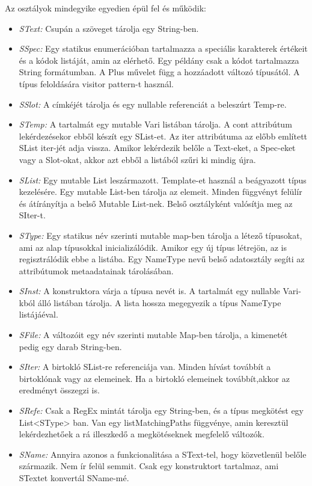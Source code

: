{Az osztályok mindegyike egyedien épül fel és működik:
\begin{itemize}
\item \emph{SText:} 
Csupán a szöveget tárolja egy String-ben.
\item \emph{SSpec:} 
Egy statikus enumerációban tartalmazza a speciális karakterek értékeit és a kódok listáját, amin az elérhető.
Egy példány csak a kódot tartalmazza String formátumban.
A Plus művelet függ a hozzáadott változó típusától.
A típus feloldására visitor pattern-t használ. 
\item \emph{SSlot:} 
A címkéjét tárolja és egy nullable referenciát a beleszúrt Temp-re. 
\item \emph{STemp:} 
A tartalmát egy mutable Vari listában tárolja.
A cont attribútum lekérdezésekor ebből készít egy SList-et.
Az iter attribútuma az előbb említett SList iter-jét adja vissza. 
Amikor lekérdezik belőle a Text-eket, a Spec-eket vagy a Slot-okat, akkor azt ebből a listából szűri ki mindig újra.
\item \emph{SList:}
Egy mutable List leszármazott.
Template-et használ a beágyazott típus kezelésére.
Egy mutable List-ben tárolja az elemeit.
Minden függvényt felülír és átírányítja a belső Mutable List-nek.
Belső osztályként valósítja meg az SIter-t. 
\item \emph{SType:} 
Egy statikus név szerinti mutable map-ben tárolja a létező típusokat, ami az alap típusokkal inicializálódik.
Amikor egy új típus létrejön, az is regisztrálódik ebbe a listába.
Egy NameType nevű belső adatosztály segíti az attribútumok metaadatainak tárolásában.
\item \emph{SInst:} 
A konstruktora várja a típusa nevét is.
A tartalmát egy nullable Vari-kból álló listában tárolja. 
A lista hossza megegyezik a típus NameType listájáéval.
\item \emph{SFile:}
A változóit egy név szerinti mutable Map-ben tárolja, a kimenetét pedig egy darab String-ben.
\item \emph{SIter:}
A birtokló SList-re referenciája van.
Minden hívást továbbít a birtoklónak vagy az elemeinek.
Ha a birtokló elemeinek továbbít,akkor az eredményt összegzi is. 
\item \emph{SRefe:}
Csak a RegEx mintát tárolja egy String-ben, és a típus megkötést egy List<SType> ban.
Van egy listMatchingPaths függvénye, amin keresztül lekérdezhetőek a rá illeszkedő a megkötéseknek megfelelő változók.
\item \emph{SName:} 
Annyira azonos a funkcionalitása a SText-tel, hogy közvetlenül belőle származik. Nem ír felül semmit.
Csak egy konstruktort tartalmaz, ami STextet konvertál SName-mé.
\end{itemize}

}
